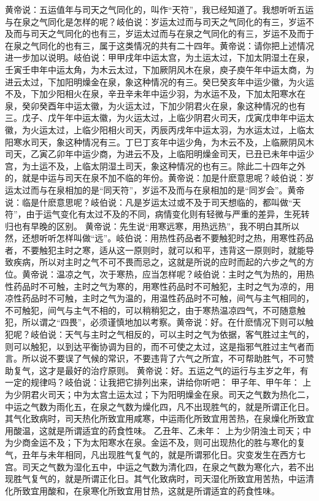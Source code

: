 \documentclass[a4paper,12pt,UTF8,twoside]{ctexbook}
\begin{document}
黄帝说：五运值年与司天之气同化的，叫作“天符”，我已经知道了。我想听听五运与在泉之气同化是怎样的呢？岐伯说：岁运太过而与司天之气同化的有三，岁运不及而与司天之气同化的也有三，岁运太过而与在泉之气同化的有三，岁运不及而于在泉之气同化的也有三，属于这类情况的共有二十四年。黄帝说：请你把上述情况进一步加以说明。岐伯说：甲甲戌年中运太宫，为土运太过，下加太阴湿土在泉，壬寅壬申年中运太角，为木云太过，下加厥阴风木在泉，庾子庾午年中运太商，为进云太过，下加阳明燥金在泉，象这种情况的有三。癸巳癸亥年中运少徽，为火运不及，下加少阳相火在泉，辛丑辛未年中运少羽，为水运不及，下加太阳寒水在泉，癸卯癸酉年中运太徽，为火运太过，下加少阴君火在泉，象这种情况的也有三。戊子、戊午年中运太徽，为火运太过，上临少阴君火司天，戊寅戊申年中运太徽，为火运太过，上临少阳相火司天，丙辰丙戌年中运太羽，为水运太过，上临太阳寒水司天，象这种情况有三。丁巳丁亥年中运少角，为木云不及，上临厥阴风木司天，乙寅乙卯年中运少商，为进云不及，上临阳明燥金司天，已丑已未年中运少宫，为土运不及，上临太阴湿土司天，象这种情况的也有三。除此二十四年之外的，就是中运与司天在泉不加不临的年份。黄帝说：加是什麽意思呢？岐伯说：岁运太过而与在泉相加的是“同天符”，岁运不及而与在泉相加的是“同岁会”。黄帝说：临是什麽意思呢？岐伯说：凡是岁运太过或不及于司天想临的，都叫做“天符”，由于运气变化有太过不及的不同，病情变化则有轻微与严重的差异，生死转归也有早晚的区别。
黄帝说：先生说“用寒远寒，用热远热”，我不明白其所以然，还想听听怎样叫做“远”。岐伯说：用热性药品者不要触犯时之热，用寒性药品者，不要触犯主时之寒，适从这一原则时，就可以和平，违背这一原则时，就能导致疾病，所以对主时之气不可不畏而忌之，这就是所说的应时而起的六步之气的方位。黄帝说：温凉之气，次于寒热，应当怎样呢？岐伯说：主时之气为热的，用热性药品时不可触，主时之气为寒的，用寒性药品时不可触犯，主时之气为凉的，用凉性药品时不可触，主时之气为温的，用温性药品时不可触，间气与主气相同的，不可触犯，间气与主气不相的，可以稍稍犯之，由于寒热温凉四气，不可随意触犯，所以谓之“四畏”，必须谨慎地加以考察。黄帝说：好。在什麽情况下则可以触犯呢？岐伯说：天气与主时之气相反的，可以主时之气为依据，客气胜过主气的，则可以触犯，以到达平衡协调为目的，而不可使之太过，这是指邪气胜过主气者而言。所以说不要误了气候的常识，不要违背了六气之所宜，不可帮助胜气，不可赞助复气，这才是最好的治疗原则。
黄帝说：好。五运之气的运行与主岁之年，有一定的规律吗？岐伯说：让我把它排列出来，讲给你听吧：
甲子年、甲午年：
上为少阴君火司天；中为太宫土运太过；下为阳明燥金在泉。司天之气数为热化二，中运之气数为雨化五，在泉之气数为燥化四，凡不出现胜气的，就是所谓正化日。其气化致病时，司天热化所致宜用咸寒，中运雨化所致宜用苦热，在泉燥化所致宜用酸温，这就是所谓适宜的药食性味。
乙丑年、乙未年：
上为少阴浊土司天；中为少商金运不及；下为太阳寒水在泉。金运不及，则可出现热化的胜与寒化的复气，丑年与未年相同，凡出现胜气复气的，就是所谓邪化日。灾变发生在西方七宫。司天之气数为湿化五中，中运之气数为清化四，在泉之气数为寒化六，若不出现胜气复气的，就是所谓正化日。其气化致病时，司天湿化所致宜用苦热，中运清化所致宜用酸和，在泉寒化所致宜用甘热，这就是所谓适宜的药食性味。
\end{document}
